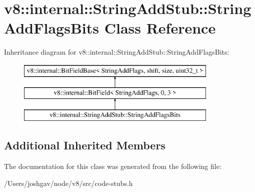 \hypertarget{classv8_1_1internal_1_1_string_add_stub_1_1_string_add_flags_bits}{}\section{v8\+:\+:internal\+:\+:String\+Add\+Stub\+:\+:String\+Add\+Flags\+Bits Class Reference}
\label{classv8_1_1internal_1_1_string_add_stub_1_1_string_add_flags_bits}
Inheritance diagram for v8\+:\+:internal\+:\+:String\+Add\+Stub\+:\+:String\+Add\+Flags\+Bits\+:\begin{figure}[H]
\begin{center}
\leavevmode
\includegraphics[height=3.000000cm]{classv8_1_1internal_1_1_string_add_stub_1_1_string_add_flags_bits}
\end{center}
\end{figure}
\subsection*{Additional Inherited Members}


The documentation for this class was generated from the following file\+:\begin{DoxyCompactItemize}
\item 
/\+Users/joshgav/node/v8/src/code-\/stubs.\+h\end{DoxyCompactItemize}

